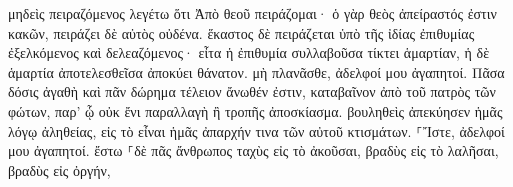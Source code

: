 \documentclass{openreader}
\begin{document}
μηδεὶς πειραζόμενος λεγέτω ὅτι Ἀπὸ θεοῦ πειράζομαι· ὁ γὰρ θεὸς ἀπείραστός ἐστιν κακῶν, πειράζει δὲ αὐτὸς οὐδένα. 
ἕκαστος δὲ πειράζεται ὑπὸ τῆς ἰδίας ἐπιθυμίας ἐξελκόμενος καὶ δελεαζόμενος· 
εἶτα ἡ ἐπιθυμία συλλαβοῦσα τίκτει ἁμαρτίαν, ἡ δὲ ἁμαρτία ἀποτελεσθεῖσα ἀποκύει θάνατον. 
μὴ πλανᾶσθε, ἀδελφοί μου ἀγαπητοί. 
Πᾶσα δόσις ἀγαθὴ καὶ πᾶν δώρημα τέλειον ἄνωθέν ἐστιν, καταβαῖνον ἀπὸ τοῦ πατρὸς τῶν φώτων, παρ’ ᾧ οὐκ ἔνι παραλλαγὴ ἢ τροπῆς ἀποσκίασμα. 
βουληθεὶς ἀπεκύησεν ἡμᾶς λόγῳ ἀληθείας, εἰς τὸ εἶναι ἡμᾶς ἀπαρχήν τινα τῶν αὐτοῦ κτισμάτων. 
⸀Ἴστε, ἀδελφοί μου ἀγαπητοί. ἔστω ⸀δὲ πᾶς ἄνθρωπος ταχὺς εἰς τὸ ἀκοῦσαι, βραδὺς εἰς τὸ λαλῆσαι, βραδὺς εἰς ὀργήν, 
\end{document}

